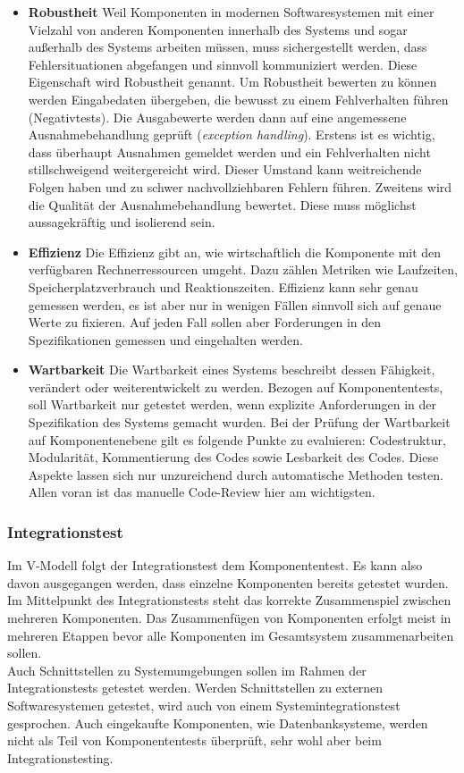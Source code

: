 \begin{itemize}

\item \textbf{Robustheit} Weil Komponenten in modernen Softwaresystemen mit einer Vielzahl von anderen Komponenten innerhalb des Systems und sogar außerhalb des Systems arbeiten müssen, muss sichergestellt werden, dass Fehlersituationen abgefangen und sinnvoll kommuniziert werden. Diese Eigenschaft wird Robustheit genannt. Um Robustheit bewerten zu können werden Eingabedaten übergeben, die bewusst zu einem Fehlverhalten führen (Negativtests). Die Ausgabewerte werden dann auf eine angemessene Ausnahmebehandlung geprüft (\textit{exception handling}). Erstens ist es wichtig, dass überhaupt Ausnahmen gemeldet werden und ein Fehlverhalten nicht stillschweigend weitergereicht wird. Dieser Umstand kann weitreichende Folgen haben und zu schwer nachvollziehbaren Fehlern führen. Zweitens wird die Qualität der Ausnahmebehandlung bewertet. Diese muss möglichst aussagekräftig und isolierend sein.

\item \textbf{Effizienz} Die Effizienz gibt an, wie wirtschaftlich die Komponente mit den verfügbaren Rechnerressourcen umgeht. Dazu zählen Metriken wie Laufzeiten, Speicherplatzverbrauch und Reaktionszeiten. Effizienz kann sehr genau gemessen werden, es ist aber nur in wenigen Fällen sinnvoll sich auf genaue Werte zu fixieren. Auf jeden Fall sollen aber Forderungen in den Spezifikationen gemessen und eingehalten werden.

\item \textbf{Wartbarkeit} Die Wartbarkeit eines Systems beschreibt dessen Fähigkeit, verändert oder weiterentwickelt zu werden. Bezogen auf Komponententests, soll Wartbarkeit nur getestet werden, wenn explizite Anforderungen in der Spezifikation des Systems gemacht wurden. Bei der Prüfung der Wartbarkeit auf Komponentenebene gilt es folgende Punkte zu evaluieren: Codestruktur, Modularität, Kommentierung des Codes sowie Lesbarkeit des Codes. Diese Aspekte lassen sich nur unzureichend durch automatische Methoden testen. Allen voran ist das manuelle Code-Review hier am wichtigsten.

\end{itemize}

\subsubsection{Integrationstest}
Im V-Modell folgt der Integrationstest dem Komponententest. Es kann also davon ausgegangen werden, dass einzelne Komponenten bereits getestet wurden. Im Mittelpunkt des Integrationstests steht das korrekte Zusammenspiel zwischen mehreren Komponenten. Das Zusammenfügen von Komponenten erfolgt meist in mehreren Etappen bevor alle Komponenten im Gesamtsystem zusammenarbeiten sollen.\\
Auch Schnittstellen zu Systemumgebungen sollen im Rahmen der Integrationstests getestet werden. Werden Schnittstellen zu externen Softwaresystemen getestet, wird auch von einem Systemintegrationstest gesprochen. Auch eingekaufte Komponenten, wie Datenbanksysteme, werden nicht als Teil von Komponententests überprüft, sehr wohl aber beim Integrationstesting.

